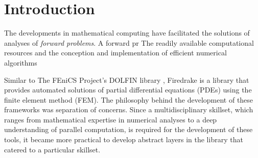 \chapter{Introduction}
\label{chapter:introduction}


The developments in mathematical computing have facilitated the solutions of analyses of \textit{forward problems}. A forward pr The readily available computational resources and the conception and implementation of efficient numerical algorithms



Similar to The FEniCS Project's DOLFIN library \cite{alnaes2015fenics, logg2010dolfin}, Firedrake \cite{rathgeber2016firedrake} is a library that provides automated solutions of partial differential equations (PDEs) using the finite element method (FEM). The philosophy behind the development of these frameworks was separation of concerns. Since a multidisciplinary skillset, which ranges from mathematical expertise in numerical analyses to a deep understanding of parallel computation, is required for the development of these tools, it became more practical to develop abstract layers in the library that catered to a particular skillset.